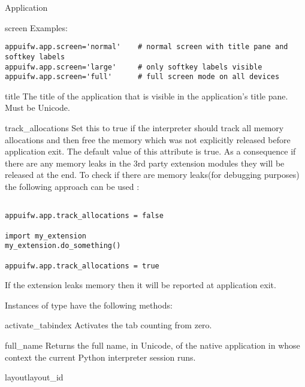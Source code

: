 \begin{classdesc*}{Application}
\begin{memberdesc}[Application]{screen}
Examples:
\begin{verbatim}
appuifw.app.screen='normal'    # normal screen with title pane and softkey labels
appuifw.app.screen='large'     # only softkey labels visible
appuifw.app.screen='full'      # full screen mode on all devices
\end{verbatim}
\end{memberdesc}

\begin{memberdesc}[Application]{title}
The title of the application that is visible in the application's title
pane. Must be Unicode.
\end{memberdesc}

\begin{memberdesc}[Application]{track_allocations}
Set this to true if the interpreter should track all memory allocations and then
free the memory which was not explicitly released before application exit. The default
value of this attribute is true. As a consequence if there are any memory leaks in the
3rd party extension modules they will be released at the end. To check if there are
memory leaks(for debugging purposes) the following approach can be used :
\begin{verbatim}

appuifw.app.track_allocations = false

import my_extension
my_extension.do_something()

appuifw.app.track_allocations = true

\end{verbatim}
If the extension leaks memory then it will be reported at application exit.

\end{memberdesc}


Instances of  type have the following methods:

\begin{methoddesc}[Application]{activate_tab}{index}
Activates the tab  counting from zero.
\end{methoddesc}

\begin{methoddesc}[Application]{full_name}{}
Returns the full name, in Unicode, of the native application in whose 
context the current Python interpreter session runs.
\end{methoddesc}

\begin{methoddesc}[Application]{layout}{layout_id}


\end{methoddesc}
\end{classdesc*}
